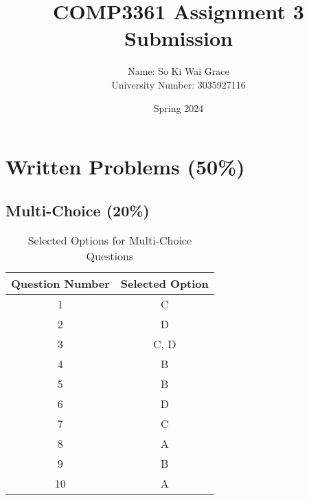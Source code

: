 \documentclass[10pt]{article}
\begin{document}
\title{COMP3361 Assignment 3 Submission}
\author{Name: So Ki Wai Grace\\ University Number: 3035927116}
\date{Spring 2024}
\maketitle

\section{Written Problems (50\%)}

\subsection{Multi-Choice (20\%)}

\begin{table}[htbp]
\centering
\begin{tabular}{@{}cc@{}}
\toprule
Question Number & Selected Option \\ \midrule
1               &              C\\
2               &              D\\
3               &              C, D\\
4               &              B\\
5               &              B\\
6               &              D\\
7               &              C\\
8               &              A\\
9               &              B\\
10              &              A\\
\bottomrule
\end{tabular}
\caption{Selected Options for Multi-Choice Questions}
\label{tab:my_label}
\end{table}
\end{document}
